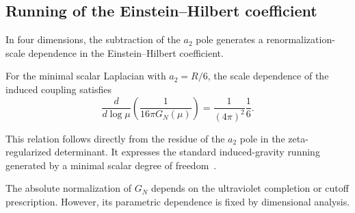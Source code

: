 \subsection{Running of the Einstein--Hilbert coefficient}
  \label{subsec:running}

  In four dimensions, the subtraction of the $a_2$ pole generates a
  renormalization-scale dependence in the Einstein--Hilbert coefficient.

  For the minimal scalar Laplacian with $a_2 = R/6$, the scale dependence
  of the induced coupling satisfies
  \begin{equation}
    \frac{d}{d\log \mu}
    \left(
      \frac{1}{16\pi G_N(\mu)}
    \right)
    =
    \frac{1}{(4\pi)^2}
    \frac{1}{6}.
  \end{equation}

  This relation follows directly from the residue of the $a_2$ pole in the
  zeta-regularized determinant.
  It expresses the standard induced-gravity running generated by a minimal
  scalar degree of freedom~\cite{BirrellDavies1982,ParkerToms2009}.

  The absolute normalization of $G_N$ depends on the ultraviolet completion
  or cutoff prescription.
  However, its parametric dependence is fixed by dimensional analysis.
